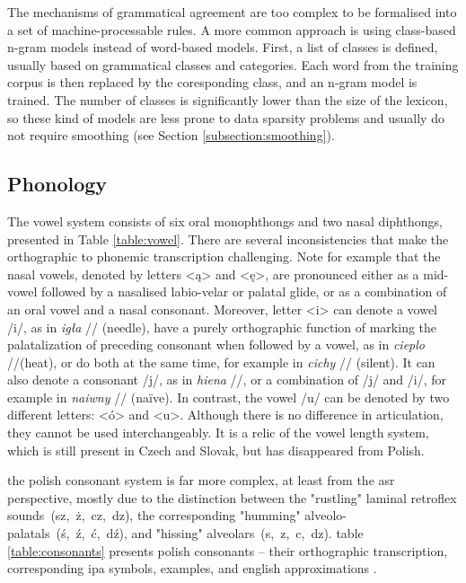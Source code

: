 The mechanisms of grammatical agreement are too complex to be formalised into a set of machine-processable rules. A more common approach is using class-based n-gram models instead of word-based models. First, a list of classes is defined, usually based on grammatical classes and categories. Each word from the training corpus is then replaced by the coresponding class, and an n-gram model is trained. The number of classes is significantly lower than the size of the lexicon, so these kind of models are less prone to data sparsity problems and usually do not require smoothing (see Section \ref{subsection:smoothing}).

\subsection{Phonology}
The vowel system consists of six oral monophthongs and two nasal diphthongs, presented in Table \ref{table:vowel}. There are several inconsistencies that make the orthographic to phonemic transcription challenging. Note for example that the nasal vowels, denoted by letters <ą> and <ę>, are pronounced either as a mid-vowel followed by a nasalised labio-velar or palatal glide, or as a combination of an oral vowel and a nasal consonant. Moreover, letter <i> can denote a vowel /i/, as in \textit{igła} // (needle), have a purely orthographic function of marking the palatalization of preceding consonant when followed by a vowel, as in \textit{cieplo} //(heat), or do both at the same time, for example in \textit{cichy} // (silent). It can also denote a consonant /j/, as in \textit{hiena} //, or a combination of /j/ and /i/, for example in \textit{naiwny} // (naïve). In contrast, the vowel /u/ can be denoted by two different letters: <ó> and <u>. Although there is no difference in articulation, they cannot be used interchangeably. It is a relic of the vowel length system, which is still present in Czech and Slovak, but has disappeared from Polish.

the polish consonant system is far more complex, at least from the \gls{asr} perspective, mostly due to the distinction between the "rustling" laminal retroflex sounds~(sz,~ż,~cz,~dz), the corresponding "humming" alveolo-palatals~(ś,~ź,~ć,~dź), and "hissing" alveolars~(s,~z,~c,~dz). table \ref{table:consonants} presents polish consonants -- their orthographic transcription, corresponding \gls{ipa} symbols, examples, and english approximations \cite{gussmann2007phonology}. 

